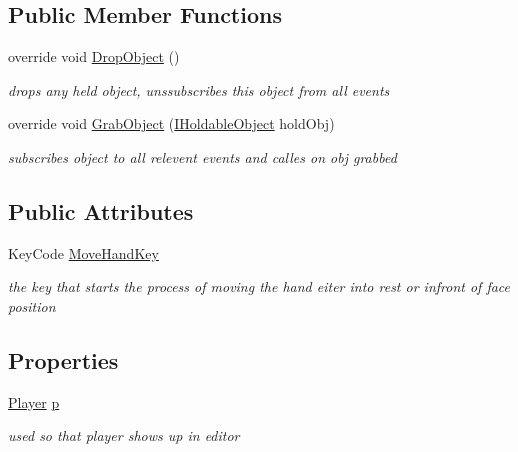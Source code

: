 \subsection*{Public Member Functions}
\begin{DoxyCompactItemize}
\item 
override void \mbox{\hyperlink{class_p_c_player_hand_a42c7ffd95f8493901c93e2c1e4576585}{Drop\+Object}} ()
\begin{DoxyCompactList}\small\item\em drops any held object, unssubscribes this object from all events \end{DoxyCompactList}\item 
override void \mbox{\hyperlink{class_p_c_player_hand_a08da28b459501727d269733569559c24}{Grab\+Object}} (\mbox{\hyperlink{interface_i_holdable_object}{I\+Holdable\+Object}} hold\+Obj)
\begin{DoxyCompactList}\small\item\em subscribes object to all relevent events and calles on obj grabbed \end{DoxyCompactList}\end{DoxyCompactItemize}
\subsection*{Public Attributes}
\begin{DoxyCompactItemize}
\item 
Key\+Code \mbox{\hyperlink{class_p_c_player_hand_a4d757a10aeef1d8b06d19687218584f0}{Move\+Hand\+Key}}
\begin{DoxyCompactList}\small\item\em the key that starts the process of moving the hand eiter into rest or infront of face position \end{DoxyCompactList}\end{DoxyCompactItemize}
\subsection*{Properties}
\begin{DoxyCompactItemize}
\item 
\mbox{\hyperlink{class_player}{Player}} \mbox{\hyperlink{class_p_c_player_hand_a8c3efd819803169fc351ce8e456a8a0f}{p}}
\begin{DoxyCompactList}\small\item\em used so that player shows up in editor \end{DoxyCompactList}\end{DoxyCompactItemize}
